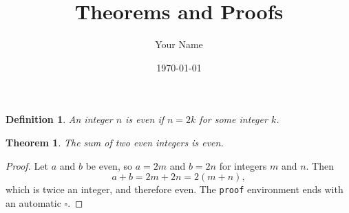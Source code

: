 \documentclass[12pt]{article}
\title{Theorems and Proofs}
\author{Your Name}
\date{\today}
\newtheorem{theorem}{Theorem}
\newtheorem{definition}{Definition}
\begin{document}
\maketitle

\begin{definition}
An integer $n$ is \emph{even} if $n = 2k$ for some integer $k$.
\end{definition}

\begin{theorem}
The sum of two even integers is even.
\end{theorem}

\begin{proof}
Let $a$ and $b$ be even, so $a = 2m$ and $b = 2n$ for integers $m$ and
$n$. Then
\[
    a + b = 2m + 2n = 2(m + n),
\]
which is twice an integer, and therefore even. The \texttt{proof}
environment ends with an automatic $\square$.
\end{proof}
\end{document}
